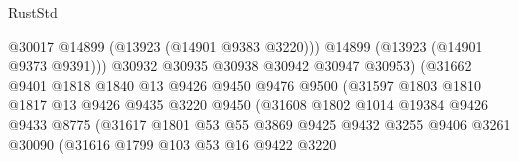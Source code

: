 \begin{lexlean}{RustStd}
\begin{coremodule}
                                          @30017
                                          @14899
                                          (@13923 (@14901 @9383 @3220)))
                                        @14899
                                        (@13923 (@14901 @9373 @9391)))
                                      @30932
                                      @30935
                                      @30938
                                      @30942
                                      @30947
                                      @30953)
                                    (@31662
                                      @9401
                                      @1818
                                      @1840
                                      @13
                                      @9426
                                      @9450
                                      @9476
                                      @9500
                                      (@31597
                                        @1803
                                        @1810
                                        @1817
                                        @13
                                        @9426
                                        @9435
                                        @3220
                                        @9450
                                        (@31608
                                          @1802
                                          @1014
                                          @19384
                                          @9426
                                          @9433
                                          @8775
                                          (@31617
                                            @1801
                                            @53
                                            @55
                                            @3869
                                            @9425
                                            @9432
                                            @3255
                                            @9406
                                            @3261
                                            @30090
                                            (@31616
                                              @1799
                                              @103
                                              @53
                                              @16
                                              @9422
                                              @3220

\end{coremodule}
\end{lexlean}
